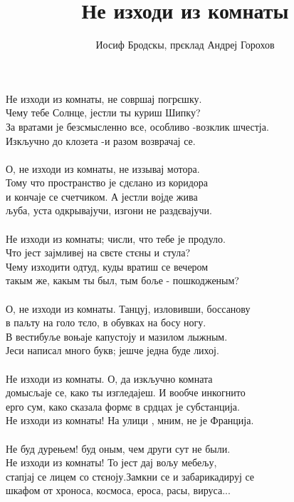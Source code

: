 \documentclass[11pt,a4paper]{book}
\author{Иосиф Бродскы, прєклад Андреј Горохов}
\title{Не изходи из комнаты}
\begin{document}
\maketitle
Не изходи из комнаты, не совршај погрєшку. \\
Чему тебе Солнце, јестли ты куриш Шипку? \\
За вратами је безсмысленно все, особливо -возклик шчестја. \\
Изкључно до клозета -и разом возврачај се. \\
\\

О, не изходи из комнаты, не иззывај мотора. \\
Тому что пространство је сдєлано из коридора \\
и кончаје се счетчиком. А јестли војде жива \\
љуба, уста одкрывајучи, изгони не раздєвајучи. \\
\\

Не изходи из комнаты; числи, что тебе је продуло. \\
Что јест зајмливеј на свєте стєны и стула? \\
Чему изходити одтуд, куды вратиш се вечером \\
такым же, какым ты был, тым боље - пошкодженым? \\
\\

О, не изходи из комнаты. Танцуј, изловивши, боссанову\\
в паљту на голо тєло, в обувках на босу ногу. \\
В вестибуље воњаје капустоју и мазилом лыжным. \\
Јеси написал много букв; јешче једна буде лихој. \\
\\

Не изходи из комнаты. О, да изкључно комната \\
домысљаје се, како ты изгледајеш. И вообче инкогнито \\
ерго сум, како сказала формє в срдцах  је субстанција. \\
Не изходи из комнаты! На улици , мним, не је Франција. \\
\\

Не буд дурењем! буд оным, чем други сут не были. \\
Не изходи из комнаты! То јест дај вољу мебељу, \\
стапјај се лицем со стєноју.Замкни се  и забарикадируј се \\
шкафом от хроноса, космоса, ероса, расы, вируса... \\
\\
\end{document}
